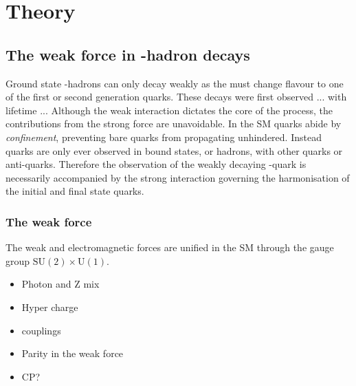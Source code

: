 \chapter{Theory} 
\label{ch:theory}

\minitoc





\section{The weak force in \bquark-hadron decays}

Ground state \bquark-hadrons can only decay weakly as the \bquark must change flavour to one of the first or second generation quarks.
These decays were first observed ... with lifetime ...
Although the weak interaction dictates the core of the process, the contributions from the strong force are unavoidable. In the SM quarks abide by \emph{confinement}, preventing bare quarks from propagating unhindered. Instead quarks are only ever observed in bound states, or hadrons, with other quarks or anti-quarks. Therefore the observation of the weakly decaying \bquark-quark is necessarily accompanied by the strong interaction governing the harmonisation of the initial and final state quarks.


\subsection{The weak force}

The weak and electromagnetic forces are unified in the SM through the gauge group $\text{SU}(2)\times\text{U}(1)$.

{\color{Red}
\begin{itemize}
\item Photon and Z mix
\item Hyper charge
\item couplings
\item Parity in the weak force
\item CP? 
\end{itemize}}

